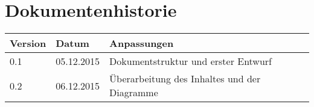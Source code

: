 \section*{Dokumentenhistorie}
\begin{tabularx}{\linewidth}{|l|r|X|} \hline
Version & \multicolumn{1}{l|}{Datum} 			& Anpassungen \\ \hline
0.1 & 05.12.2015 & Dokumentstruktur und erster Entwurf \\ \hline
0.2 & 06.12.2015 & Überarbeitung des Inhaltes und der Diagramme \\ \hline
\end{tabularx}

\clearpage

